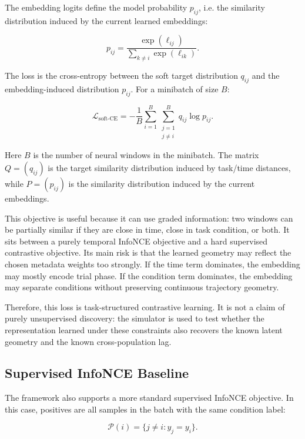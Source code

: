 \documentclass[11pt]{article}
\begin{document}
The embedding logits define the model probability $p_{ij}$, i.e. the
similarity distribution induced by the current learned embeddings:

\begin{equation}
p_{ij} =
\frac{\exp(\ell_{ij})}{\sum_{k \ne i}\exp(\ell_{ik})}.
\end{equation}

The loss is the cross-entropy between the soft target distribution $q_{ij}$
and the embedding-induced distribution $p_{ij}$. For a minibatch of size $B$:

\begin{equation}
\mathcal{L}_{\text{soft-CE}} =
- \frac{1}{B}
\sum_{i=1}^{B}
\sum_{\substack{j=1 \\ j \ne i}}^{B}
q_{ij}\log p_{ij}.
\end{equation}

Here $B$ is the number of neural windows in the minibatch. The matrix
$Q=(q_{ij})$ is the target similarity distribution induced by task/time
distances, while $P=(p_{ij})$ is the similarity distribution induced by the
current embeddings.

This objective is useful because it can use graded information: two windows can
be partially similar if they are close in time, close in task condition, or
both. It sits between a purely temporal InfoNCE objective and a hard supervised
contrastive objective. Its main risk is that the learned geometry may reflect
the chosen metadata weights too strongly. If the time term dominates, the
embedding may mostly encode trial phase. If the condition term dominates, the
embedding may separate conditions without preserving continuous trajectory
geometry.

Therefore, this loss is task-structured contrastive learning. It is not a claim
of purely unsupervised discovery: the simulator is used to test whether the
representation learned under these constraints also recovers the known latent
geometry and the known cross-population lag.

\subsection{Supervised InfoNCE Baseline}

The framework also supports a more standard supervised InfoNCE objective. In
this case, positives are all samples in the batch with the same condition
label:

\begin{equation}
\mathcal{P}(i) =
\{j \ne i : y_j = y_i\}.
\end{equation}
\end{document}
